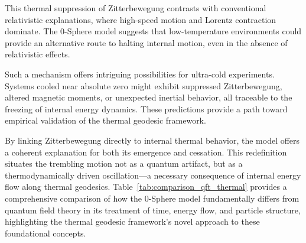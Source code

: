 \documentclass[%
 reprint,
 amsmath,amssymb,
 aps,
]{revtex4-1}
\numberwithin{equation}{section}%
\begin{document}
This thermal suppression of Zitterbewegung contrasts with conventional relativistic explanations, where high-speed motion and Lorentz contraction dominate. The 0-Sphere model suggests that low-temperature environments could provide an alternative route to halting internal motion, even in the absence of relativistic effects.

Such a mechanism offers intriguing possibilities for ultra-cold experiments. Systems cooled near absolute zero might exhibit suppressed Zitterbewegung, altered magnetic moments, or unexpected inertial behavior, all traceable to the freezing of internal energy dynamics. These predictions provide a path toward empirical validation of the thermal geodesic framework.

By linking Zitterbewegung directly to internal thermal behavior, the model offers a coherent explanation for both its emergence and cessation. This redefinition situates the trembling motion not as a quantum artifact, but as a thermodynamically driven oscillation---a necessary consequence of internal energy flow along thermal geodesics. Table~\ref{tab:comparison_qft_thermal} provides a comprehensive comparison of how the 0-Sphere model fundamentally differs from quantum field theory in its treatment of time, energy flow, and particle structure, highlighting the thermal geodesic framework's novel approach to these foundational concepts.
\end{document}
